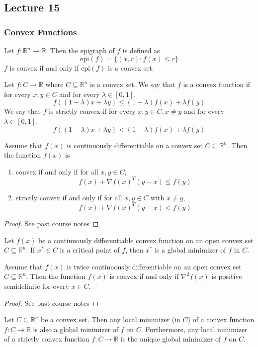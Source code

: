 
\subsection{Lecture 15}
\subsubsection{Convex Functions}
\begin{definition}[Epigraph]
    Let $f: \mathbb R^n \to \mathbb R$. Then the epigraph of $f$ is defined as
    $$\text{epi}(f) = \{(x, r): f(x) \leq r\}$$
    $f$ is convex if and only if $\text{epi}(f)$ is a convex set.
\end{definition}

\begin{definition}
    Let $f: C \to \mathbb R$ where $C \subseteq \mathbb R^n$ is a convex set. We say that $f$ is a convex function if for every $x, y \in C$ and for every $\lambda \in [0,1]$,
    $$f((1 - \lambda)x + \lambda y) \leq (1 - \lambda) f(x) + \lambda f(y)$$
    We say that $f$ is strictly convex if for every $x, y \in C, x \neq y$ and for every $\lambda \in [0,1]$,
    $$f((1 - \lambda)x + \lambda y) < (1 - \lambda) f(x) + \lambda f(y)$$
\end{definition}
\begin{theorem}
    Assume that $f(x)$ is continuously differentiable on a convex set $C \subseteq \mathbb R^n$. Then the function $f(x)$ is
    \begin{enumerate}
        \item convex if and only if for all $x, y \in C$, $$f(x) + \nabla f(x)^T (y - x) \leq f(y)$$
        \item strictly convex if and only if for all $x, y \in C$ with $x \neq y$,
        $$f(x) + \nabla f(x)^T (y - x) < f(y)$$
    \end{enumerate}
\end{theorem}
\begin{proof}[Proof]
    See past course notes
\end{proof}
\begin{corollary}
    Let $f(x)$ be a continuously differentiable convex function on an open convex set $C \subseteq \mathbb R^n$. If $x^* \in C$ is a critical point of $f$, then $x^*$ is a global minimizer of $f$ in $C$.
\end{corollary}
\begin{theorem}
    Assume that $f(x)$ is twice continuously differentiable on an open convex set $C \subseteq \mathbb R^n$. Then the function $f(x)$ is convex if and only if $\nabla^2 f(x)$ is positive semidefinite for every $x \in C$.
\end{theorem}
\begin{proof}[Proof]
    See past course notes
\end{proof}
\begin{theorem}[]
    Let $C \subseteq \mathbb R^n$ be a convex set. Then any local minimizer (in $C$) of a convex function $f: C \to \mathbb R$ is also a global minimizer of $f$ on $C$. Furthermore, any local minimizer of a strictly convex function $f: C \to \mathbb R$ is the unique global minimizer of $f$ on $C$.
\end{theorem}